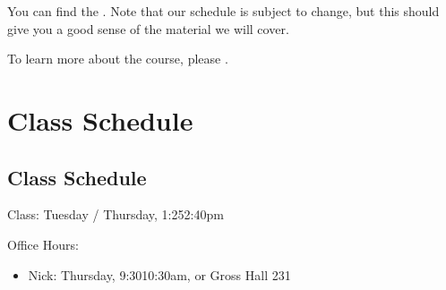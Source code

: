 \documentclass[letterpaper,10pt,english]{jupyterBook}
\begin{document}
\sphinxAtStartPar
You can find the {\hyperref[\detokenize{00_class_schedule/class_schedule::doc}]{}}. Note that our schedule is subject to change, but this should give you a good sense of the material we will cover.

\begin{DUlineblock}{0em}
\item[] 
\end{DUlineblock}

\sphinxAtStartPar
To learn more about the course, please .

\sphinxstepscope


\part{Class Schedule}

\sphinxstepscope


\chapter{Class Schedule}
\label{\detokenize{00_class_schedule/class_schedule:class-schedule}}\label{\detokenize{00_class_schedule/class_schedule::doc}}
\sphinxAtStartPar
Class: Tuesday / Thursday, 1:25\sphinxhyphen{}2:40pm

\sphinxAtStartPar
Office Hours:
\begin{itemize}
\item {} 
\sphinxAtStartPar
Nick: Thursday, 9:30\sphinxhyphen{}10:30am,  or Gross Hall 231

\end{itemize}
\end{document}

